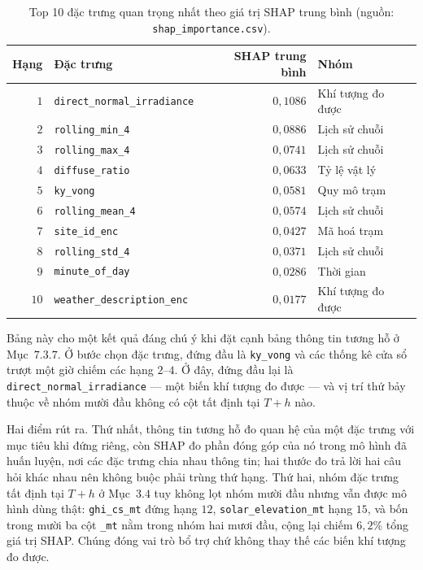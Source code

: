 \begin{table}[htbp]
\centering
\caption{Top 10 đặc trưng quan trọng nhất theo giá trị SHAP trung bình (nguồn: \texttt{shap\_importance.csv}).}
\label{tab:shap_global}
\small
\begin{tabular}{r l r l}
\toprule
\textbf{Hạng} & \textbf{Đặc trưng} & \textbf{SHAP trung bình} & \textbf{Nhóm} \\
\midrule
$1$  & \texttt{direct\_normal\_irradiance} & $0{,}1086$ & Khí tượng đo được \\
$2$  & \texttt{rolling\_min\_4}            & $0{,}0886$ & Lịch sử chuỗi \\
$3$  & \texttt{rolling\_max\_4}            & $0{,}0741$ & Lịch sử chuỗi \\
$4$  & \texttt{diffuse\_ratio}             & $0{,}0633$ & Tỷ lệ vật lý \\
$5$  & \texttt{ky\_vong}                  & $0{,}0581$ & Quy mô trạm \\
$6$  & \texttt{rolling\_mean\_4}           & $0{,}0574$ & Lịch sử chuỗi \\
$7$  & \texttt{site\_id\_enc}              & $0{,}0427$ & Mã hoá trạm \\
$8$  & \texttt{rolling\_std\_4}            & $0{,}0371$ & Lịch sử chuỗi \\
$9$  & \texttt{minute\_of\_day}            & $0{,}0286$ & Thời gian \\
$10$ & \texttt{weather\_description\_enc}  & $0{,}0177$ & Khí tượng đo được \\
\bottomrule
\end{tabular}
\end{table}

Bảng này cho một kết quả đáng chú ý khi đặt cạnh bảng thông tin tương hỗ ở Mục~$7.3.7$. Ở bước
chọn đặc trưng, đứng đầu là \texttt{ky\_vong} và các thống kê cửa sổ trượt một giờ chiếm các
hạng $2$--$4$. Ở đây, đứng đầu lại là
\texttt{direct\_normal\_irradiance} --- một biến khí tượng đo được --- và vị trí thứ bảy thuộc về
nhóm mười đầu không có cột tất định tại $T{+}h$ nào.

Hai điểm rút ra. Thứ nhất, thông tin tương hỗ đo quan hệ của một đặc trưng với mục tiêu khi
đứng riêng, còn SHAP đo phần đóng góp của nó trong mô hình đã huấn luyện, nơi các đặc
trưng chia nhau thông tin; hai thước đo trả lời hai câu hỏi khác nhau nên không buộc phải trùng
thứ hạng. Thứ hai, nhóm đặc trưng tất định tại $T{+}h$ ở Mục~$3.4$ tuy không lọt nhóm mười đầu
nhưng vẫn được mô hình dùng thật: \texttt{ghi\_cs\_mt} đứng hạng $12$, \texttt{solar\_elevation\_mt}
hạng $15$, và bốn trong mười ba cột \texttt{\_mt} nằm trong nhóm hai mươi đầu, cộng lại chiếm
$6{,}2\%$ tổng giá trị SHAP. Chúng đóng vai trò bổ trợ chứ không thay thế các biến khí tượng đo được.

